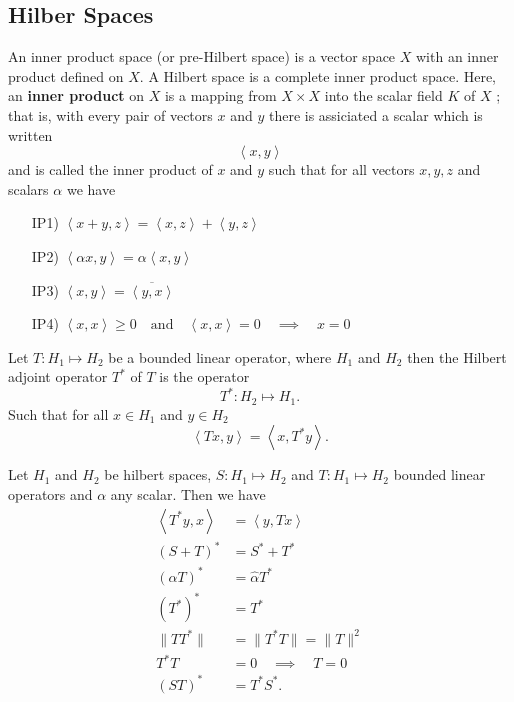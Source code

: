 \documentclass{article}
\theoremstyle{remark}
\begin{document}
\subsection{Hilber Spaces}%
\label{sub:hilber_spaces}

\begin{definition}
  An inner product space (or pre-Hilbert space) is a vector space $X$ with an inner product defined on  $X$. A Hilbert space is a complete inner product space. Here, an \textbf{inner product} on $X$ is a mapping from $X \times X $ into the scalar field $K$ of $X$ ; that is,  with every pair of vectors $x$ and $y$ there is assiciated a scalar which is written \[
  \left<x,y \right>
  \] and is called the inner product of $x$ and  $y$ such that for all vectors $x,y,z$ and scalars $\alpha$ we have 
  \begin{enumerate}
    \item[IP1)] $\left< x +y ,z\right> = \left<x,z \right> + \left<y,z \right>$ 
    \item[IP2)] $\left<\alpha x , y \right> = \alpha \left<x,y \right> $
    \item[IP3)] $ \left<x,y \right> =\overline{\left<  y,x\right>} $
    \item[IP4)] $ \left<x,x \right> \ge 0 \quad \text{and} \quad \left<x,x \right> = 0 \quad \implies \quad x= 0    $
  \end{enumerate}
  
\end{definition}

\begin{definition}
  Let $T: H_1 \mapsto H_2$ be a bounded linear operator, where $H_1$ and $H_2$ then the Hilbert adjoint operator $T^{*}$ of $T$ is the operator \[
  T^{*}: H_2 \mapsto H_1 .
  \] 
  Such that for all $x \in H_1$ and $y \in H_2$ 
  \begin{equation}
  \label{eq:ajoint}
  \left<Tx,y \right> = \left<x,  T^{*}y \right>
  .\end{equation}
  
\end{definition}

\begin{theorem}
  Let $H_1$ and $H_2$ be hilbert spaces, $S: H_1 \mapsto H_2$ and $T: H_1 \mapsto H_2$ bounded linear operators and $\alpha$ any scalar. Then we have
  \begin{align}
    \left<T^{*}y,x \right> &= \left<y,Tx \right> \\
    \left( S +T \right)^{*} &= S^{*} + T^{*} \\
    \left( \alpha T \right)^{*} &= \hat{\alpha} T^{*} \\
    \left( T^{*} \right)^{*} &=   T^{*}\\  
    \|T T^{*}\| &=  \|T^{*} T\| =  \|T\|^{2} \\
    T^{*}T &= 0 \quad \implies \quad T=0   \\
    \left( ST \right)^{*} &= T^{*}S^{*} 
  .\end{align}
  
\end{theorem}
\end{document}
